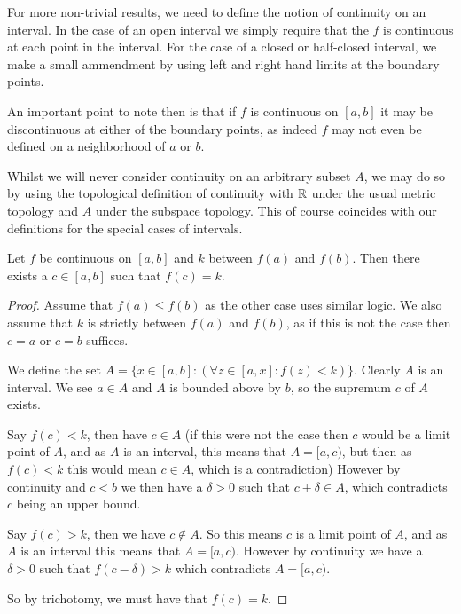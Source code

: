 \documentclass[]{article}
\begin{document}
For more non-trivial results, we need to define the notion of continuity on an interval. In the case of an open interval we simply require that the $f$ is continuous at each point in the interval. For the case of a closed or half-closed interval, we make a small ammendment by using left and right hand limits at the boundary points. 

An important point to note then is that if $f$ is continuous on $[a,b]$ it may be discontinuous at either of the boundary points, as indeed $f$ may not even be defined on a neighborhood of $a$ or $b$.

Whilst we will never consider continuity on an arbitrary subset $A$, we may do so by using the topological definition of continuity with $\mathbb{R}$ under the usual metric topology and $A$ under the subspace topology. This of course coincides with our definitions for the special cases of intervals.

\begin{thm} 
		Let $f$ be continuous on $[a,b]$ and $k$ between $f(a)$ and $f(b)$. Then there exists a $c \in [a,b]$ such that $f(c) = k$.
\end{thm}

\begin{proof}
		Assume that $f(a) \leq f(b)$ as the other case uses similar logic. We also assume that $k$ is strictly between $f(a)$ and $f(b)$, as if this is not the case then $c = a$ or $c = b$ suffices.

		We define the set $A = \{x \in [a,b]: (\forall z \in [a,x]: f(z) < k)\}$. Clearly $A$ is an interval. We see $a \in A$ and $A$ is bounded above by $b$, so the supremum $c$ of $A$ exists.

		Say $f(c) < k$, then have $c \in A$ (if this were not the case then $c$ would be a limit point of $A$, and as $A$ is an interval, this means that $A = [a,c)$, but then as $f(c) < k$ this would mean $c \in A$, which is a contradiction) However by continuity and $c < b$ we then have a $\delta > 0$ such that $c + \delta \in A$, which contradicts $c$ being an upper bound.

		Say $f(c) > k$, then we have $c \notin A$. So this means $c$ is a limit point of $A$, and as $A$ is an interval this means that $A = [a,c)$. However by continuity we have a $\delta > 0$ such that $f(c-\delta) > k$ which contradicts $A = [a,c)$.

		So by trichotomy, we must have that $f(c) = k$.
\end{proof}
\end{document}
